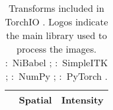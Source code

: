 \newcommand{\trsf}[2]{\texttt{#1}\textsuperscript{\textbf{#2}}}
\newcommand{\trsfl}[2]{\texttt{#1} \texttt{[image: \#2]}}

\begin{table}[ht]
    \caption[Transforms included in TorchIO \torchioversion]{
        Transforms included in TorchIO \torchioversion.
        Logos indicate the main library used to process the images.
        \protect{}:~NiBabel \cite{brett_nipynibabel_2020};
        \protect{}:~SimpleITK \cite{lowekamp_design_2013};
        \protect{}:~NumPy \cite{van_der_walt_numpy_2011};
        \protect{}:~PyTorch \cite{paszke_pytorch_2019}.
    }
    \small
    \begin{center}
        \begin{tabular}{@{}c | c c@{}}
        \toprule
                                                    & \textbf{Spatial}                      & \textbf{Intensity}                                                      \\

            \midrule


\end{tabular}
\end{center}
\end{table}
